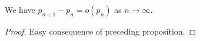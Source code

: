 \begin{corollary}
\label{pn_pn_plus_one}
\leanok
We have $p_{n+1} - p_n = o(p_n)$
    as $n \to \infty$.
\end{corollary}
\begin{proof}
\leanok
Easy consequence of preceding proposition.
\end{proof}
